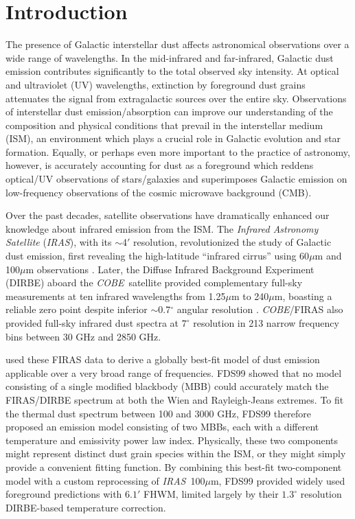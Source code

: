 \documentclass{emulateapj}
\newcommand{\IRAS}{{\it IRAS}}
\newcommand{\COBE}{{\it COBE}}
\begin{document}
\section{Introduction}
The presence of Galactic interstellar dust affects
astronomical observations over a wide range of wavelengths. In the mid-infrared
and far-infrared, Galactic dust emission contributes significantly
to the total observed sky intensity. At optical and ultraviolet (UV) 
wavelengths, extinction by foreground dust grains attenuates the signal from 
extragalactic sources over the entire sky. Observations of interstellar dust 
emission/absorption can improve our understanding of the composition and 
physical conditions that prevail in the interstellar medium (ISM), an 
environment which plays a crucial role in Galactic evolution and star 
formation. Equally, or perhaps even more important to the practice of 
astronomy, however, is accurately accounting for dust as a foreground which 
reddens optical/UV observations of stars/galaxies and superimposes Galactic 
emission on low-frequency observations of the cosmic microwave background 
(CMB). 

Over the past decades, satellite observations have dramatically enhanced our
knowledge about infrared emission from the ISM. The \textit{Infrared Astronomy 
Satellite} (\IRAS), with its $\sim$4$'$ resolution, revolutionized the study of
 Galactic dust emission, first revealing the high-latitude ``infrared cirrus'' 
using 60$\mu$m and 100$\mu$m observations \citep{low84, wheelock94}. Later, the
Diffuse Infrared Background Experiment (DIRBE) aboard the \COBE~satellite 
provided complementary full-sky measurements at ten infrared wavelengths from 
1.25$\mu$m to 240$\mu$m, boasting a reliable zero point despite inferior 
$\sim$0.7$^{\circ}$ angular resolution \citep{boggess92}. \COBE/FIRAS 
\citep{firas} also provided full-sky infrared dust spectra at $7^{\circ}$ 
resolution in 213 narrow frequency bins between 30 GHz and 2850 GHz.


\citet[hereafter FDS99]{FDS99} used these FIRAS data to derive a globally 
best-fit model of dust emission applicable over a very broad range of 
frequencies. FDS99 showed that no model consisting of a single modified 
blackbody (MBB) could accurately match the FIRAS/DIRBE spectrum at both the 
Wien and Rayleigh-Jeans extremes. To fit the thermal dust spectrum between 100 
and 3000 GHz, FDS99 therefore proposed an emission model consisting of two 
MBBs, each with a different temperature and emissivity power law index. 
Physically, these two components might represent distinct dust grain species 
within the ISM, or they might simply provide a convenient fitting function. By 
combining this best-fit two-component model with a custom reprocessing of 
\IRAS~100$\mu$m, FDS99 provided widely used foreground predictions with $6.1'$ 
FHWM, limited largely by their $1.3^{\circ}$ resolution DIRBE-based temperature
correction.
\end{document}

